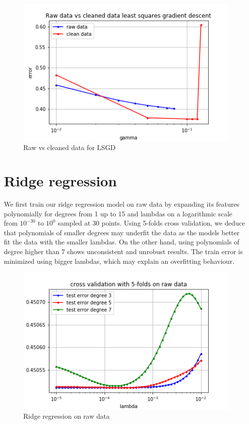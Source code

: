 \documentclass[11pt, a4paper, twocolumn]{article}
\begin{document}
\begin{figure}[h!]
  \includegraphics[width=\linewidth]{raw_vs_clean_lsgd.png}
  \caption{Raw vs cleaned data for LSGD}
    \label{fig:raw_clean_lsgd}
\end{figure}

\section{Ridge regression}
We first train our ridge regression model on raw data by
expanding its features polynomially for degrees from 1 up
to 15 and lambdas on a
logarithmic scale from $10^{-30}$ to
$10^0$ sampled at 30 points. Using 5-folds cross validation, we deduce that
polynomials of smaller degrees may underfit the data as
the models better fit the data with the smaller lambdas.
On the other hand, using polynomials of degree higher than
7 shows unconsistent and unrobust results. The train error
is minimized using bigger lambdas, which may explain an
overfitting behaviour.

\begin{figure}[h!]
  \includegraphics[width=\linewidth]{plots/ridge_raw.png}
  \caption{Ridge regression on raw data}
  \label{fig:ridge_raw}
\end{figure}
\end{document}
